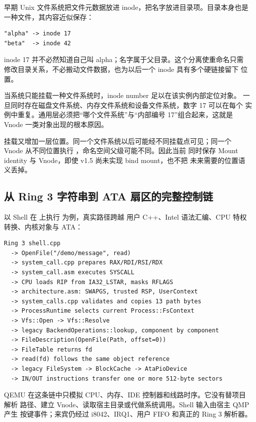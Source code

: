 早期 Unix 文件系统把文件元数据放进 inode，把名字放进目录项。目录本身也是
一种文件，其内容近似保存：

\begin{lstlisting}[caption={目录项表达的是父目录中的名字映射}]
"alpha" -> inode 17
"beta"  -> inode 42
\end{lstlisting}

inode 17 并不必然知道自己叫 alpha；名字属于父目录。这个分离使重命名只需
修改目录关系，不必搬动文件数据，也为以后一个 inode 具有多个硬链接留下
位置。

当系统只能挂载一种文件系统时，inode number 足以在该实例内部定位对象。
一旦同时存在磁盘文件系统、内存文件系统和设备文件系统，数字 17 可以在每个
实例中重复。通用层必须把“哪个文件系统”与“内部编号 17”组合起来，这就是
Vnode 一类对象出现的根本原因。

挂载又增加一层位置。同一个文件系统以后可能经不同挂载点可见；同一个 Vnode
从不同位置执行 ，命名空间父级可能不同。因此当前 
同时保存 Mount identity 与 Vnode，即使 v1.5 尚未实现 bind mount，也不把
未来需要的位置语义丢掉。

\subsection{从 Ring 3 字符串到 ATA 扇区的完整控制链}

以 Shell 在  上执行  为例，真实路径跨越
用户 C++、Intel 语法汇编、CPU 特权转换、内核对象与 ATA：

\begin{lstlisting}[caption={v1.5 文件读取的端到端路径}]
Ring 3 shell.cpp
  -> OpenFile("/demo/message", read)
  -> system_call.cpp prepares RAX/RDI/RSI/RDX
  -> system_call.asm executes SYSCALL
  -> CPU loads RIP from IA32_LSTAR, masks RFLAGS
  -> architecture.asm: SWAPGS, trusted RSP, UserContext
  -> system_calls.cpp validates and copies 13 path bytes
  -> ProcessRuntime selects current Process::FsContext
  -> Vfs::Open -> Vfs::Resolve
  -> legacy BackendOperations::lookup, component by component
  -> FileDescription(OpenFile(Path, offset=0))
  -> FileTable returns fd
  -> read(fd) follows the same object reference
  -> legacy FileSystem -> BlockCache -> AtaPioDevice
  -> IN/OUT instructions transfer one or more 512-byte sectors
\end{lstlisting}

QEMU 在这条链中只模拟 CPU、内存、IDE 控制器和线路时序。它没有替项目解析
路径、建立 Vnode、读取宿主目录或代做系统调用。Shell 输入由宿主 QMP 产生
按键事件；来宾仍经过 i8042、IRQ1、用户 FIFO 和真正的 Ring 3 解析器。

